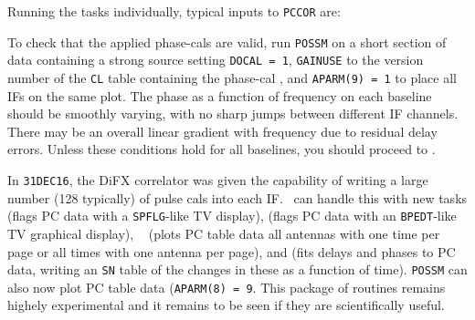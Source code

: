 Running the tasks individually, typical inputs to {\tt PCCOR} are:

To check that the applied phase-cals are valid, run {\tt POSSM} on a
short section of data containing a strong source setting {\tt DOCAL =
1}, {\tt GAINUSE} to the version number of the {\tt CL} table
containing the phase-cal , and {\tt APARM(9) = 1} to
place all IFs on the same plot.  The phase as a function of frequency
on each baseline should be smoothly varying, with no sharp jumps
between different IF channels.  There may be an overall linear
gradient with frequency due to residual delay errors.  Unless these
conditions hold for all baselines, you should proceed to
.

In {\tt 31DEC16}, the DiFX correlator was given the capability of
writing a large number (128 typically) of pulse cals into each IF\@.
\AIPS\ can handle this with new tasks {\tt {}} (flags PC
data with a {\tt SPFLG}-like TV display), {\tt {}} (flags PC
data with an {\tt BPEDT}-like TV graphical display), {\tt
{}} (plots PC table data all antennas with one time per page
or all times with one antenna per page), and {\tt {}} (fits
delays and phases to PC data, writing an {\tt SN} table of the changes
in these as a function of time).  {\tt POSSM} can also now plot PC
table data ({\tt APARM(8) = 9}.  This package of routines remains
highely experimental and it remains to be seen if they are
scientifically useful.


